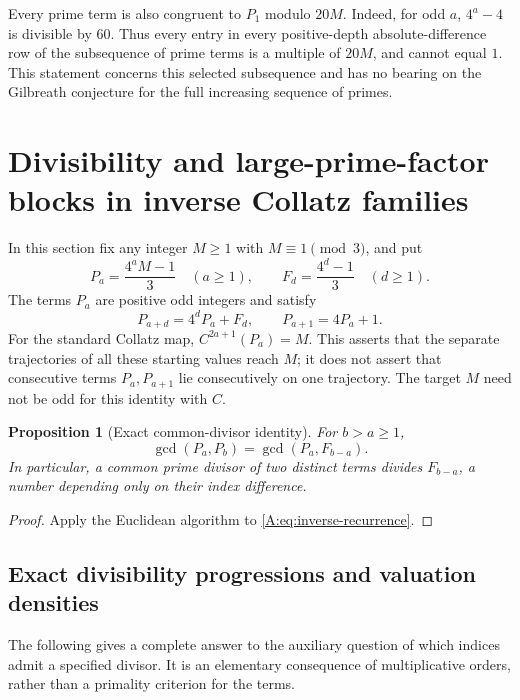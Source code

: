 \documentclass[11pt,a4paper]{article}
\newtheorem{proposition}[theorem]{Proposition}
\theoremstyle{definition}
\theoremstyle{remark}
\numberwithin{equation}{section}
\begin{document}
Every prime term is also congruent to $P_1$ modulo $20M$. Indeed, for odd
$a$, $4^a-4$ is divisible by $60$. Thus every entry in every positive-depth
absolute-difference row of the subsequence of prime terms is a multiple
of $20M$, and cannot equal $1$. This statement concerns this selected
subsequence and has no bearing on the Gilbreath conjecture for the full
increasing sequence of primes.

\section{Divisibility and large-prime-factor blocks in inverse Collatz families}
\label{A:sec:inverse-blocks}
In this section fix any integer $M\ge1$ with $M\equiv1\pmod3$, and put
\[
 P_a=\frac{4^aM-1}{3}\quad(a\ge1),\qquad
 F_d=\frac{4^d-1}{3}\quad(d\ge1).
\]
The terms $P_a$ are positive odd integers and satisfy
\begin{equation}\label{A:eq:inverse-recurrence}
 P_{a+d}=4^dP_a+F_d,\qquad P_{a+1}=4P_a+1.
\end{equation}
For the standard Collatz map, $C^{2a+1}(P_a)=M$. This asserts that the
separate trajectories of all these starting values reach $M$; it does not
assert that consecutive terms $P_a,P_{a+1}$ lie consecutively on one
trajectory. The target $M$ need not be odd for this identity with $C$.

\begin{proposition}[Exact common-divisor identity]\label{A:prop:inverse-gcd}
For $b>a\ge1$,
\[
 \gcd(P_a,P_b)=\gcd(P_a,F_{b-a}).
\]
In particular, a common prime divisor of two distinct terms divides
$F_{b-a}$, a number depending only on their index difference.
\end{proposition}
\begin{proof}
Apply the Euclidean algorithm to \eqref{A:eq:inverse-recurrence}.
\end{proof}

\subsection{Exact divisibility progressions and valuation densities}
The following gives a complete answer to the auxiliary question of which
indices admit a specified divisor. It is an elementary consequence of
multiplicative orders, rather than a primality criterion for the terms.
\end{document}
